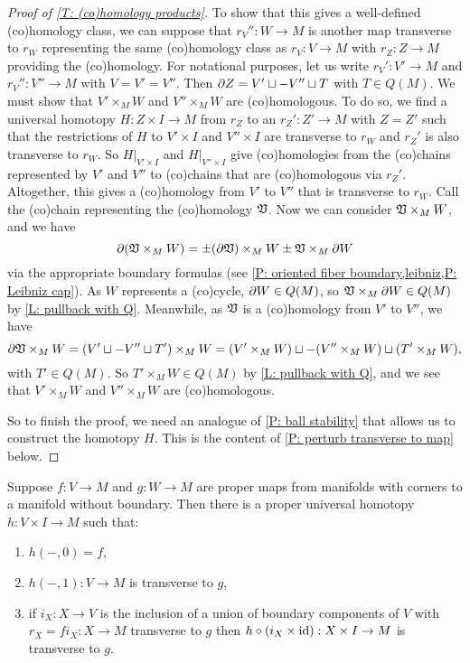 \begin{proof}[Proof of \cref{T: (co)homology products}]
	To show that this gives a well-defined (co)homology class, we can suppose that $r_V'' \colon W \to M$ is another map transverse to $r_W$ representing the same (co)homology class as $r_V \colon V \to M$ with $r_Z:Z \to M$ providing the (co)homology.
	For notational purposes, let us write $r_V' \colon V' \to M$ and $r_V'' \colon V'' \to M$ with $V = V' = V''$.
	Then $\partial Z = V' \sqcup -V'' \sqcup T$ with $T \in Q(M)$.
	We must show that $V' \times_M W$ and $V'' \times_M W$ are (co)homologous.
	To do so, we find a universal homotopy $H \colon Z \times I \to M$ from $r_Z$ to an $r_Z':Z' \to M$ with $Z = Z'$ such that the restrictions of $H$ to $V' \times I$ and $V'' \times I$ are transverse to $r_W$ and $r_Z'$ is also transverse to $r_W$.
	So $H|_{V' \times I}$ and $H|_{V'' \times I}$ give (co)homologies from the (co)chains represented by $V'$ and $V''$ to (co)chains that are (co)homologous via $r_Z'$.
	Altogether, this gives a (co)homology from $V'$ to $V''$ that is transverse to $r_W$.
	Call the (co)chain representing the (co)homology $\mathfrak V$.
	Now we can consider $\mathfrak V \times_M W$, and we have $$\partial (\mathfrak V \times_M W) = \pm (\partial \mathfrak V) \times_M W\pm \mathfrak V \times_M \partial W$$ via the appropriate boundary formulas (see \cref{P: oriented fiber boundary,leibniz,P: Leibniz cap}).
	As $W$ represents a (co)cycle, $\partial W \in Q(M)$, so $\mathfrak V \times_M \partial W \in Q(M)$ by \cref{L: pullback with Q}.
	Meanwhile, as $\mathfrak V$ is a (co)homology from $V'$ to $V''$, we have $$\partial \mathfrak V \times_M W = (V' \sqcup -V'' \sqcup T') \times_M W = (V' \times_M W) \sqcup -(V'' \times_M W) \sqcup (T' \times_M W),$$
	with $T' \in Q(M)$.
	So $T' \times_M W \in Q(M)$ by \cref{L: pullback with Q}, and we see that $V' \times_M W$ and $V'' \times_M W$ are (co)homologous.

	So to finish the proof, we need an analogue of \cref{P: ball stability} that allows us to construct the homotopy $H$.
	This is the content of \cref{P: perturb transverse to map} below.
\end{proof}


\begin{proposition}\label{P: perturb transverse to map}
	Suppose $f \colon V \to M$ and $g \colon W \to M$ are proper maps from manifolds with corners to a manifold without boundary.
	Then there is a proper universal homotopy $h \colon V \times I \to M$ such that:
	\begin{enumerate}
		\item $h(-,0) = f$,
		\item $h(-,1) \colon V \to M$ is transverse to $g$,
		\item if $i_{X}:X \to V$ is the inclusion of a union of boundary components of $V$ with $r_X = fi_X:X \to M$ transverse to $g$ then $h \circ (i_{X} \times \mathrm{id}):X \times I \to M$ is transverse to $g$.
	\end{enumerate}
\end{proposition}

